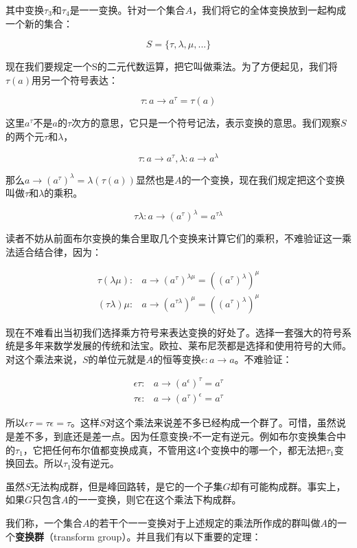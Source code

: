 \documentclass{article}
\begin{document}
其中变换$\tau_3$和$\tau_4$是一一变换。针对一个集合$A$，我们将它的全体变换放到一起构成一个新的集合：

\[
S = \{\tau, \lambda, \mu, ...\}
\]

现在我们要规定一个S的二元代数运算，把它叫做乘法。为了方便起见，我们将$\tau(a)$用另一个符号表达：

\[
\tau: a \to a^\tau = \tau(a)
\]

这里$a^\tau$不是$a$的$\tau$次方的意思，它只是一个符号记法，表示变换的意思。我们观察$S$的两个元$\tau$和$\lambda$，

\[
\tau: a \to a^\tau,  \lambda: a \to a^\lambda
\]

那么$a \to (a^\tau)^\lambda = \lambda(\tau(a))$显然也是$A$的一个变换，现在我们规定把这个变换叫做$\tau$和$\lambda$的乘积。

\[
\tau\lambda: a \to (a^\tau)^\lambda = a^{\tau\lambda}
\]

读者不妨从前面布尔变换的集合里取几个变换来计算它们的乘积，不难验证这一乘法适合结合律，因为：

\[
\begin{array}{rl}
\tau(\lambda\mu): & a \to (a^\tau)^{\lambda\mu} = ((a^\tau)^\lambda)^\mu \\
(\tau\lambda)\mu: & a \to (a^{\tau\lambda})^\mu = ((a^\tau)^\lambda)^\mu
\end{array}
\]

现在不难看出当初我们选择乘方符号来表达变换的好处了。选择一套强大的符号系统是多年来数学发展的传统和法宝。欧拉、莱布尼茨都是选择和使用符号的大师。对这个乘法来说，$S$的单位元就是$A$的恒等变换$\epsilon: a \to a$。不难验证：

\[
\begin{array}{rl}
\epsilon\tau: & a \to (a^\epsilon)^\tau = a^\tau \\
\tau\epsilon: & a \to (a^\tau)^\epsilon = a^\tau
\end{array}
\]

所以$\epsilon\tau = \tau\epsilon = \tau$。这样$S$对这个乘法来说差不多已经构成一个群了。可惜，虽然说是差不多，到底还是差一点。因为任意变换$\tau$不一定有逆元。例如布尔变换集合中的$\tau_1$，它把任何布尔值都变换成真，不管用这4个变换中的哪一个，都无法把$\tau_1$变换回去。所以$\tau_1$没有逆元。

虽然$S$无法构成群，但是峰回路转，是它的一个子集$G$却有可能构成群。事实上，如果$G$只包含$A$的一一变换，则它在这个乘法下构成群。

我们称，一个集合$A$的若干个一一变换对于上述规定的乘法所作成的群叫做$A$的一个\textbf{变换群}（transform group）。并且我们有以下重要的定理：
\end{document}
